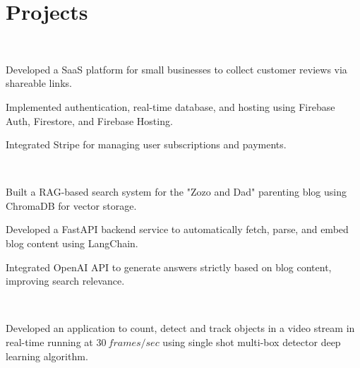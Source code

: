 \documentclass[]{sumbal-resume}
\begin{document}
\sectionsep

\section{Projects}

 \\
\begin{tightemize}
\item Developed a SaaS platform for small businesses to collect customer reviews via shareable links.
\item Implemented authentication, real-time database, and hosting using Firebase Auth, Firestore, and Firebase Hosting.
\item Integrated Stripe for managing user subscriptions and payments.
\end{tightemize}

 \\
\begin{tightemize}
\item Built a RAG-based search system for the "Zozo and Dad" parenting blog using ChromaDB for vector storage.
\item Developed a FastAPI backend service to automatically fetch, parse, and embed blog content using LangChain.
\item Integrated OpenAI API to generate answers strictly based on blog content, improving  search relevance.
\end{tightemize}




 \\
\begin{tightemize}
\item Developed an application to count, detect and track objects in a video stream in real-time running at $30 \ frames/sec$ using single shot multi-box detector deep learning algorithm.
\end{tightemize}
\end{document}
